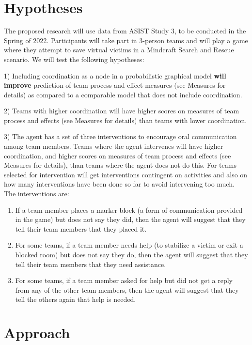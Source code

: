 
\section{Hypotheses}
The proposed research will use data from ASIST Study 3, to be conducted in the Spring of 2022. Participants will take part in 3-person teams and will play a game where they attempt to save virtual victims in a Mindcraft Search and Rescue scenario. We will test the following hypotheses:

1) Including coordination as a node in a probabilistic graphical model
\textbf{will improve} prediction of team process and effect measures (see Measures for details)  as compared to a comparable model that does not include coordination.

2) Teams with higher coordination will have higher scores on measures of team process and effects (see Measures for details) than teams with lower coordination.

3) The agent has a set of three interventions to encourage oral communication among
team members. Teams where the agent intervenes will have higher coordination,
and higher scores on measures of team process and effects (see Measures for
details), than teams where the agent does not do this. For teams selected for
intervention will get interventions contingent on activities and also on how
many interventions have been done so far to avoid intervening too much.  The
interventions are:
\begin{enumerate}
    \item
    If a team member places a marker block (a form of communication provided in
    the game) but does not say they did, then the agent will suggest that they
    tell their team members that they placed it. 
    \item
    For some teams, if a team member needs help (to stabilize a victim or exit a
    blocked room) but does not say they do, then the agent will suggest that
    they tell their team members that they need assistance. 
    \item
    For some teams, if a team member asked for help but did not get a reply from
    any of the other team members, then the agent will suggest that they tell
    the others again that help is needed. 
\end{enumerate}

\section{Approach}

